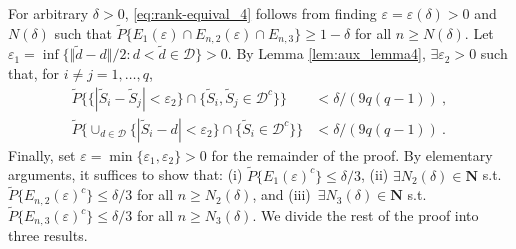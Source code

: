 \documentclass[11pt]{article}
\numberwithin{equation}{section}
\begin{document}
For arbitrary $\delta >0$, \eqref{eq:rank-equival_4} follows from finding $ \varepsilon =\varepsilon (\delta )>0$ and $N(\delta) $ such that $\tilde{P}\{ E_{1}(\varepsilon )\cap E_{n,2}(\varepsilon )\cap E_{n,3}\} \geq 1-\delta $ for all $n\geq N(\delta) $. Let $\varepsilon_{1}=\inf \{ \Vert \tilde{d}-d\Vert /2:d<\tilde{ d}\in \mathcal{D}\} >0$. By Lemma \ref{lem:aux_lemma4}, $\exists \varepsilon _{2}>0$ such that, for $i\not=j=1,\ldots ,q$, 
\begin{align}
    \tilde{P}\{\{ |{ \tilde{S}}_{i}-{\tilde{S}}_{j}|<\varepsilon _{2}\} \cap \{ {\tilde{S}}_{i},{\tilde{S}}_{j}\in \mathcal{D} ^{c}\} \} &<\delta /(9q(q-1))~, \label{eq:delta-bound-1} \\
    \tilde{P}\{\cup _{d\in \mathcal{D}}\{|{\tilde{S}}_{i}-{d}|< \varepsilon _{2}\}\cap \{{ \tilde{S}}_{i}\in \mathcal{D}^{c}\mathcal{\}}\}&<\delta /(9q(q-1))~.\label{eq:delta-bound-2}
\end{align}
Finally, set $\varepsilon =\min \{ \varepsilon _{1},\varepsilon _{2}\} >0$ for the remainder of the proof. By elementary arguments, it suffices to show that: (i) $\tilde{P}\{ E_{1}(\varepsilon) ^{c}\} \leq \delta /3$, (ii) $\exists N_{2}(\delta) \in \mathbf{N}$ s.t. $ \tilde{P}\{ E_{n,2}(\varepsilon) ^{c}\} \leq \delta /3$ for all $n\geq N_{2}(\delta) $, and (iii)\ $\exists N_{3}(\delta) \in \mathbf{N}$ s.t. $\tilde{P}\{ E_{n,3}(\varepsilon) ^{c}\} \leq \delta /3$ for all $ n\geq N_{3}( \delta
) $. We divide the rest of the proof into three results.

\end{document}
